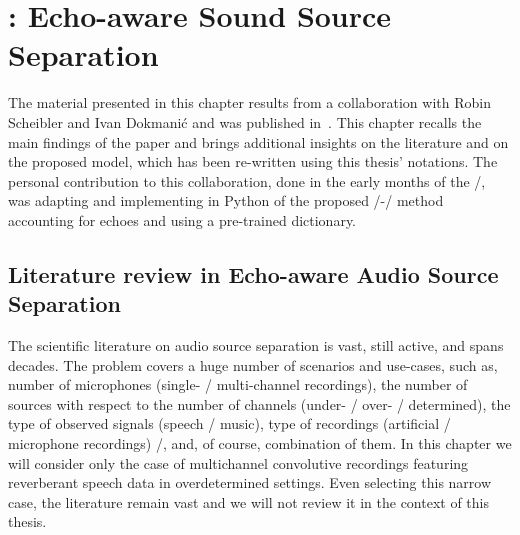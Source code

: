 \chapter{: Echo-aware Sound Source Separation}\label{ch:separake}



 \synopsisChSeparake

\mynewline
The material presented in this chapter results from a collaboration with Robin Scheibler and Ivan Dokmani\'{c} and was published in~\cite{scheibler2018separake}.
This chapter recalls the main findings of the paper and brings additional insights on the literature and on the proposed model, which has been re-written using this thesis' notations.
The personal contribution to this collaboration, done in the early months of the \PhD/, was adapting and implementing in Python of the proposed \EMdef/-\NMF/ method accounting for echoes and using a pre-trained dictionary.

\section{Literature review in Echo-aware Audio Source Separation}\label{sec:separake:sota}

The scientific literature on audio source separation is vast, still active, and spans decades.
The problem covers a huge number of scenarios and use-cases, such as, number of microphones (single- \vs/ multi-channel recordings), the number of sources with respect to the number of channels (under- \vs/ over- \vs/ determined), the type of observed signals (speech \vs/ music), type of recordings (artificial \vs/ microphone recordings) \etc/, and, of course, combination of them.
In this chapter we will consider only the case of multichannel convolutive recordings featuring reverberant speech data in overdetermined settings.
Even selecting this narrow case, the literature remain vast and we will not review it in the context of this thesis.

